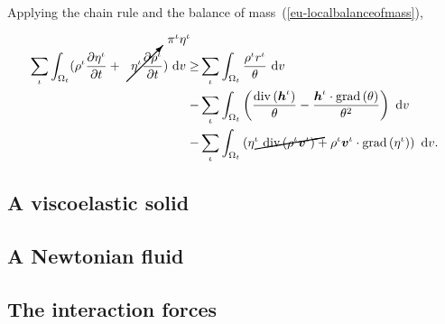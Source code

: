 \noindent Applying the chain rule and the balance of
mass~(\ref{eu-localbalanceofmass}),

\begin{equation*}
\begin{split}
\sum\limits_{\iota} \int_{\Omega_{t}}
( \rho^{\iota}  \frac{\partial \eta^{\iota}}{\partial t}
+ \cancelto{\pi^{\iota}\eta^{\iota}}{\eta^{\iota}  \frac{\partial
    \rho^{\iota}}{\partial t}}) \ \mathrm{d}v 
  \geq & \sum\limits_{\iota}  
\int_{\Omega_{t}} \frac{ \rho^{\iota}
    r^{\iota}}{\theta}\ \mathrm{d}v\\ -& \sum\limits_{\iota} 
\int_{\Omega_{t}} \left(
  \frac{\mathrm{div}\left(\bh^{\iota}\right)}{\theta}
- \frac{\bh^{\iota}\cdot\mathrm{grad}\left(\theta\right)}{\theta^{2}}
\right)\ \mathrm{d}v \\ - &
\sum\limits_{\iota} \int_{\Omega_{t}} \left( \cancel{\eta^{\iota}\ \mathrm{div}
\left(\rho^{\iota}\bv^{\iota} 
  \right)} +
  \rho^{\iota}\bv^{\iota}\cdot\mathrm{grad}\left(\eta^{\iota}\right)
  \right)\ \mathrm{d}v.
\end{split}
\end{equation*}


\subsection{A viscoelastic solid}
\label{eu-viscoelastic-solid}



\subsection{A Newtonian fluid}
\label{eu-newtonian-fluid}

\subsection{The interaction forces}
\label{eu-forces-between-phases}

